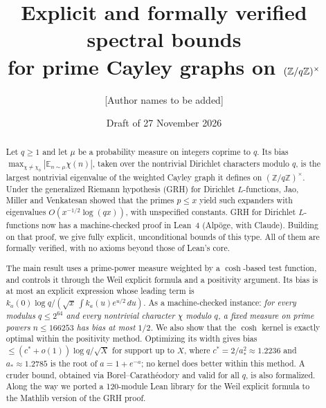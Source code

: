\documentclass[11pt]{amsart}
\title[Explicit, verified spectral bounds for prime Cayley graphs]{Explicit and formally verified spectral bounds\\ for prime Cayley graphs on $(\Z/q\Z)^\times$}
\author{[Author names to be added]}
\date{Draft of 27 November 2026}
\theoremstyle{definition}
\theoremstyle{remark}
\newcommand{\Z}{\mathbb{Z}}
\newcommand{\abs}[1]{\left\lvert #1 \right\rvert}
\begin{document}
\begin{abstract}
Let $q\ge 1$ and let $\mu$ be a probability measure on integers coprime to $q$. Its bias
$\max_{\chi\ne\chi_0}\abs{\mathbb{E}_{n\sim\mu}\chi(n)}$, taken over the nontrivial Dirichlet
characters modulo $q$, is the largest nontrivial eigenvalue of the weighted Cayley graph
it defines on $(\Z/q\Z)^\times$. Under the generalized Riemann hypothesis (GRH) for Dirichlet
$L$-functions, Jao, Miller and Venkatesan showed that the primes $p\le x$ yield such
expanders with eigenvalues $O(x^{-1/2}\log(qx))$, with unspecified constants.
GRH for Dirichlet $L$-functions now has a machine-checked proof in Lean~4 (Alpöge, with Claude).
Building on that proof, we give fully explicit, unconditional bounds of this type. All of them are
formally verified, with no axioms beyond those of Lean's core.

The main result uses a prime-power measure weighted by a $\cosh$-based test function, and controls it
through the Weil explicit formula and a positivity argument. Its bias is at most an explicit
expression whose leading term is $k_a(0)\log q/(\sqrt{x}\,\int k_a(u)e^{u/2}\,du)$. As a
machine-checked instance: \emph{for every modulus $q\le 2^{64}$ and every nontrivial character $\chi$
modulo $q$, a fixed measure on prime powers $n\le 166253$ has bias at most $1/2$.} We also show that the
$\cosh$ kernel is exactly optimal within the positivity method. Optimizing its width gives bias
$\le(c^*+o(1))\log q/\sqrt X$ for support up to $X$, where $c^*=2/a_*^2\approx1.2236$ and $a_*\approx1.2785$ is the
root of $a=1+e^{-a}$; no kernel does better within this method.
A cruder bound, obtained via Borel--Carath\'eodory and valid for all $q$, is also formalized.
Along the way we ported a 120-module Lean library for the Weil explicit formula to the Mathlib
version of the GRH proof.
\end{abstract}

\maketitle
\tableofcontents














\end{document}
